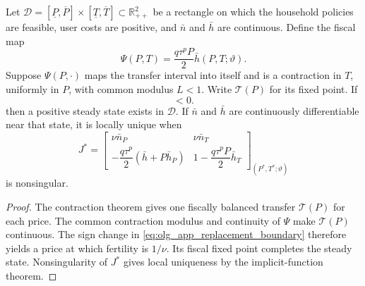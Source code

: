 \begin{proposition}
\label{prop:olg_app_ss_existence}
Let
$\mathcal D=[\underline P,\overline P]\times
[\underline T,\overline T]\subset\mathbb R_{++}^2$ be a rectangle on which
the household policies are feasible, user costs are positive, and
$\bar n$ and $\bar h$ are continuous.  Define the fiscal map
\begin{equation}
 \Psi(P,T)=\frac{q\tau^pP}{2}\bar h(P,T;\vartheta).
 \label{eq:olg_app_fiscal_map}
\end{equation}
Suppose $\Psi(P,\cdot)$ maps the transfer interval into itself and is a
contraction in $T$, uniformly in $P$, with common modulus $L<1$.  Write
$\mathcal T(P)$ for its fixed point.  If
\begin{equation}
 [\nu\bar n(\underline P,\mathcal T(\underline P);\vartheta)-1]
 [\nu\bar n(\overline P,\mathcal T(\overline P);\vartheta)-1]<0.
 \label{eq:olg_app_replacement_boundary}
\end{equation}
then a positive steady state exists in $\mathcal D$.  If $\bar n$ and $\bar h$
are continuously differentiable near that state, it is locally unique when
\begin{equation}
 J^*=\begin{bmatrix}
 \nu\bar n_P & \nu\bar n_T\\[2pt]
 -\dfrac{q\tau^p}{2}(\bar h+P\bar h_P)&
 1-\dfrac{q\tau^pP}{2}\bar h_T
 \end{bmatrix}_{(P^*,T^*;\vartheta)}
 \label{eq:olg_app_ss_jacobian}
\end{equation}
is nonsingular.
\end{proposition}

\begin{proof}
The contraction theorem gives one fiscally balanced transfer $\mathcal T(P)$
for each price.  The common contraction modulus and continuity of $\Psi$ make
$\mathcal T(P)$ continuous.  The sign change in
\eqref{eq:olg_app_replacement_boundary} therefore yields a price at which
fertility is $1/\nu$.  Its fiscal fixed point completes the steady state.
Nonsingularity of $J^*$ gives local uniqueness by the implicit-function
theorem.
\end{proof}

